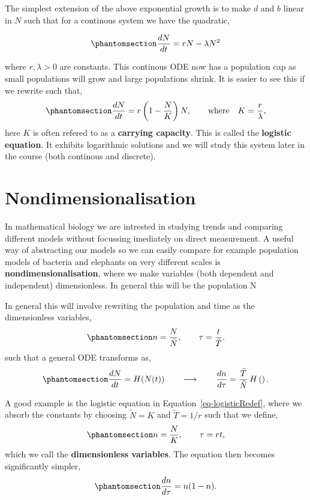 \documentclass[
  letterpaper,
  DIV=11,
  numbers=noendperiod]{scrreprt}
\begin{document}
The simplest extension of the above exponential growth is to make \(d\)
and \(b\) linear in \(N\) such that for a continous system we have the
quadratic,

\begin{equation}\protect\phantomsection\label{eq-logistic}{
\frac{dN}{dt} = rN - \lambda N^2
}\end{equation}

where \(r,\lambda > 0\) are constants. This continous ODE now has a
population cap as small populations will grow and large populations
shrink. It is easier to see this if we rewrite such that,
\begin{equation}\protect\phantomsection\label{eq-logisticRedef}{
\frac{dN}{dt} = r\left( 1 - \frac{N}{K} \right)N,\qquad \text{where} \quad K = \frac{r}{\lambda},
}\end{equation} here \(K\) is often refered to as a \textbf{carrying
capacity}. This is called the \textbf{logistic equation}. It exhibits
logarithmic solutions and we will study this system later in the course
(both continous and discrete).

\section{Nondimensionalisation}\label{nondimensionalisation}

In mathematical biology we are intrested in studying trends and
comparing different models without focussing imediately on direct
measurement. A useful way of abstracting our models so we can easily
compare for example population models of bacteria and elephants on very
different scales is \textbf{nondimensionalisation}, where we make
variables (both dependent and independent) dimensionless. In general
this will be the population N

In general this will involve rewriting the population and time as the
dimensionless variables,
\begin{equation}\protect\phantomsection\label{eq-generalNonDim}{
n = \frac{N}{\tilde{N}}, \qquad \tau = \frac{t}{\tilde{T}}.
}\end{equation} such that a general ODE transforms as,
\begin{equation}\protect\phantomsection\label{eq-nonDimTransform}{
\frac{dN}{dt} = H(N(t)) \qquad \longrightarrow \qquad \frac{dn}{d\tau} = \frac{\tilde{T}}{\tilde{N}}\, H\left(  \right).
}\end{equation}

A good example is the logistic equation in
Equation~\ref{eq-logisticRedef}, where we absorb the constants by
choosing \(\tilde{N} = K\) and \(\tilde{T} = 1/r\) such that we define,
\begin{equation}\protect\phantomsection\label{eq-nonDim}{
n = \frac{N}{K}, \qquad \tau = rt,
}\end{equation} which we call the \textbf{dimensionless variables}. The
equation then becomes significantly simpler,
\begin{equation}\protect\phantomsection\label{eq-nonDim}{
\frac{dn}{d\tau} = n(1-n).
}\end{equation}
\end{document}
